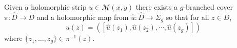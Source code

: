 

    Given a holomorphic strip $u\in \mathcal M(x, y)$ there exists a $g$-branched cover
    $\pi: \hat D\to D$ 
    and a holomorphic map from $\hat u: \hat D \to \Sigma_g$ so that for all $z\in D$, 
    \[u(z)=([\hat u(z_1), \hat u(z_2), \cdots , \hat u(z_g)])\]
    where $\{z_1, \ldots, z_g\}\in \pi^{-1}(z)$.
